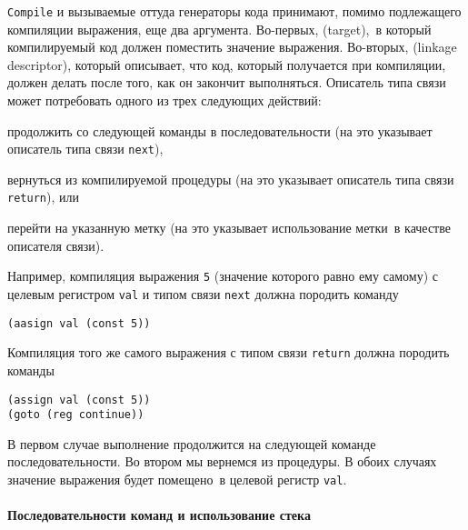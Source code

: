 {\tt Compile} и вызываемые оттуда генераторы кода
принимают, помимо подлежащего компиляции выражения, еще два
аргумента.  Во-первых, 
 (target),~в который
компилируемый код должен поместить значение выражения.  Во-вторых,
 (linkage descriptor),
который описывает, что код, который получается при компиляции, должен
делать после того, как он закончит выполняться.  Описатель типа связи
может потребовать одного из трех следующих действий:

\begin{plainlist}


\item
продолжить со следующей команды в
последовательности (на это указывает описатель типа связи
{\tt next}),

\item
вернуться из компилируемой процедуры (на это
указывает описатель типа связи {\tt return}), или

\item
перейти на указанную метку (на это указывает
использование метки~в качестве описателя связи).
\end{plainlist}

Например, компиляция выражения {\tt 5} (значение
которого равно ему самому) с целевым регистром {\tt val} и
типом связи {\tt next} должна породить команду

\begin{Verbatim}[fontsize=\small]
(aasign val (const 5))
\end{Verbatim}
Компиляция того же самого выражения с типом связи {\tt return}
должна породить команды

\begin{Verbatim}[fontsize=\small]
(assign val (const 5))
(goto (reg continue))
\end{Verbatim}
В первом случае выполнение продолжится на следующей команде
последовательности.  Во втором мы вернемся из процедуры.  В обоих
случаях значение выражения будет помещено~в целевой регистр
{\tt val}.

\paragraph{Последовательности команд и использование
стека}


